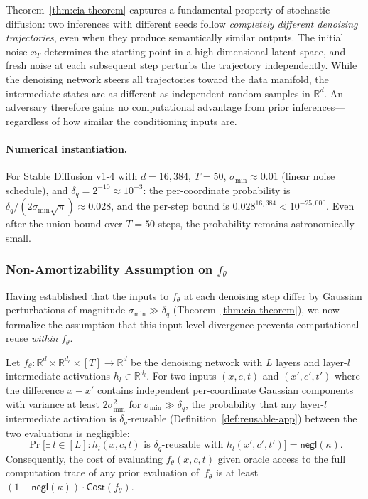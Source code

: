 Theorem~\ref{thm:cia-theorem} captures a fundamental property of stochastic diffusion: two inferences with different seeds follow \emph{completely different denoising trajectories}, even when they produce semantically similar outputs. The initial noise $x_T$ determines the starting point in a high-dimensional latent space, and fresh noise at each subsequent step perturbs the trajectory independently. While the denoising network steers all trajectories toward the data manifold, the intermediate states are as different as independent random samples in $\mathbb{R}^d$. An adversary therefore gains no computational advantage from prior inferences---regardless of how similar the conditioning inputs are.

\paragraph{Numerical instantiation.}
For Stable Diffusion v1-4 with $d = 16{,}384$, $T = 50$, $\sigma_{\min} \approx 0.01$ (linear noise schedule), and $\delta_q = 2^{-10} \approx 10^{-3}$: the per-coordinate probability is $\delta_q/(2\sigma_{\min}\sqrt{\pi}) \approx 0.028$, and the per-step bound is $0.028^{16{,}384} < 10^{-25{,}000}$. Even after the union bound over $T = 50$ steps, the probability remains astronomically small.

\subsubsection{Non-Amortizability Assumption on $f_\theta$}

Having established that the inputs to $f_\theta$ at each denoising step differ by Gaussian perturbations of magnitude $\sigma_{\min} \gg \delta_q$ (Theorem~\ref{thm:cia-theorem}), we now formalize the assumption that this input-level divergence prevents computational reuse \emph{within} $f_\theta$.

\begin{assumption}
\label{def:ftheta-assumption}
Let $f_\theta : \mathbb{R}^d \times \mathbb{R}^{d_c} \times [T] \to \mathbb{R}^d$ be the denoising network with $L$ layers and layer-$l$ intermediate activations $h_l \in \mathbb{R}^{d_l}$. For two inputs $(x,c,t)$ and $(x',c',t')$ where the difference $x - x'$ contains independent per-coordinate Gaussian components with variance at least $2\sigma_{\min}^2$ for $\sigma_{\min} \gg \delta_q$, the probability that any layer-$l$ intermediate activation is $\delta_q$-reusable (Definition~\ref{def:reusable-app}) between the two evaluations is negligible:
\[
    \Pr\!\bigl[\exists\, l \in [L] : h_l(x,c,t) \text{ is } \delta_q\text{-reusable with } h_l(x',c',t')\bigr] = \mathsf{negl}(\kappa).
\]
Consequently, the cost of evaluating $f_\theta(x,c,t)$ given oracle access to the full computation trace of any prior evaluation of~$f_\theta$ is at least $(1 - \mathsf{negl}(\kappa)) \cdot \mathsf{Cost}(f_\theta)$.
\end{assumption}

